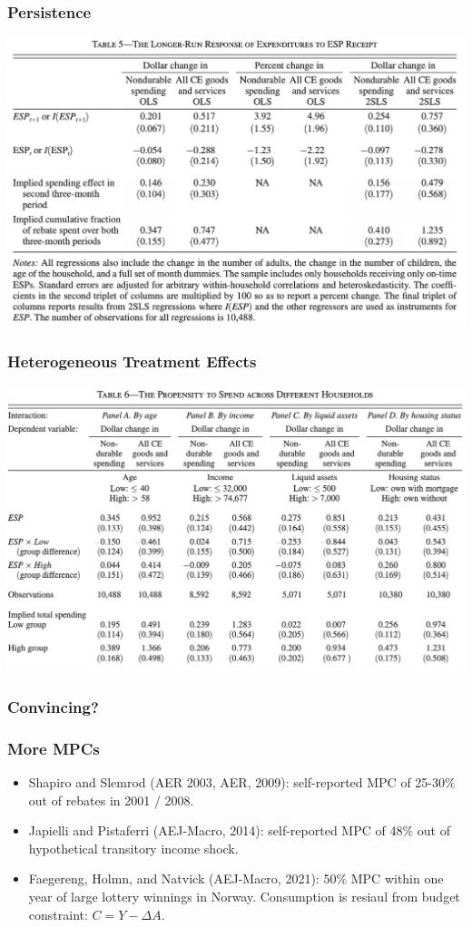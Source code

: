 \documentclass[english,xcolor=svgnames]{beamer}
\begin{document}
\begin{frame}
\frametitle[alignment=center]{Persistence}
\centering
\includegraphics[scale=0.6]{figures/PSMJTAB5.png}
\end{frame}


\begin{frame}
\frametitle[alignment=center]{Heterogeneous Treatment Effects}
\centering
\includegraphics[scale=0.6]{figures/PSMJTAB6.png}
\end{frame}


\begin{frame}
\frametitle[alignment=center]{Convincing?}

\end{frame}

\begin{frame}
\frametitle[alignment=center]{More MPCs}
\begin{itemize}
	\item Shapiro and Slemrod (AER 2003, AER, 2009): self-reported MPC of 25-30\% out of rebates in 2001 / 2008.
	\item Japielli and Pistaferri (AEJ-Macro, 2014): self-reported MPC of 48\% out of hypothetical transitory income shock.
	\item Faegereng, Holmn, and Natvick (AEJ-Macro, 2021): 50\% MPC within one year of large lottery winnings in Norway. Consumption is resiaul from budget constraint: $C=Y - \Delta A$.
\end{itemize}
\end{frame}
\end{document}
